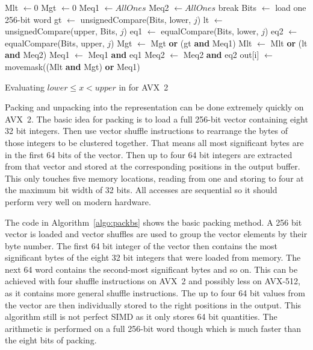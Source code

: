 \begin{algorithm}[h]
\begin{algorithmic}[1]
    \State Mlt $\gets 0$
    \State Mgt $\gets 0$
    \State Meq1 $\gets AllOnes$
    \State Meq2 $\gets AllOnes$
        \State break 
      \EndIf
      \State Bits $\gets$ load one 256-bit word
      \State gt $\gets$ unsignedCompare(Bits, lower, $j$)
      \State lt $\gets$ unsignedCompare(upper, Bits, $j$)
      \State eq1 $\gets$ equalCompare(Bits, lower, $j$)
      \State eq2 $\gets$ equalCompare(Bits, upper, $j$)
      \State Mgt $\gets$ Mgt \textbf{or} (gt \textbf{and} Meq1)
      \State Mlt $\gets$ Mlt \textbf{or} (lt \textbf{and} Meq2)
      \State Meq1 $\gets$ Meq1 \textbf{and} eq1
      \State Meq2 $\gets$ Meq2 \textbf{and} eq2
    \EndFor
    \State out[i] $\gets$ movemask((Mlt \textbf{and} Mgt) \textbf{or} Meq1)
  \EndFor
  \EndProcedure
\end{algorithmic}
\caption{Evaluating $lower \le x < upper$ in \bs{} for AVX~2}
\label{algo:byteslicescan}
\end{algorithm}

Packing and unpacking into the \bs{} representation can be done extremely
quickly on AVX~2. The basic idea for packing is to load a full 256-bit vector
containing eight 32 bit integers. Then use vector shuffle instructions to
rearrange the bytes of those integers to be clustered together. That means all
most significant bytes are in the first 64 bits of the vector. Then up to four
64 bit integers are extracted from that vector and stored at the corresponding
positions in the output buffer. This only touches five memory locations, reading
from one and storing to four at the maximum bit width of 32 bits. All accesses
are sequential so it should perform very well on modern hardware.

The code in Algorithm~\ref{algo:packbs} shows the basic packing method. A 256
bit vector is loaded and vector shuffles are used to group the vector elements
by their byte number. The first 64 bit integer of the vector then contains the
most significant bytes of the eight 32 bit integers that were loaded from
memory. The next 64 word contains the second-most significant bytes and so on.
This can be achieved with four shuffle instructions on AVX~2 and possibly less
on AVX-512, as it contains more general shuffle instructions. The up to four 64
bit values from the vector are then individually stored to the right positions
in the output. This algorithm still is not perfect SIMD as it only stores 64 bit
quantities. The arithmetic is performed on a full 256-bit word though which is
much faster than the eight bits of \bwv{} packing.

